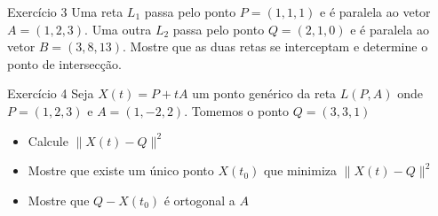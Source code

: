 \documentclass{beamer}
\begin{document}
\begin{frame}{Exercício 3}
   Uma reta $L_1$ passa pelo ponto $P=(1,1,1)$ e é paralela ao vetor $A=(1,2,3).$ Uma outra $L_2$ passa pelo ponto $Q=(2,1,0)$ e é paralela ao vetor $B=(3,8,13).$  Mostre que as duas retas se interceptam e determine o ponto de intersecção.
\end{frame}

\begin{frame}{Exercício 4}
Seja $X(t) = P + tA$ um ponto genérico da reta $L(P,A)$ onde $P=(1,2,3)$ e $A=(1,-2,2).$ Tomemos o ponto $Q=(3,3,1)$
\begin{itemize}
    \item Calcule $\| X(t) - Q \|^2$
    \item Mostre que existe um único ponto $X(t_0)$ que minimiza $\| X(t) - Q \|^2$
    \item Mostre que $Q-X(t_0)$ é ortogonal a $A$
\end{itemize}
    \end{frame}
\end{document}

